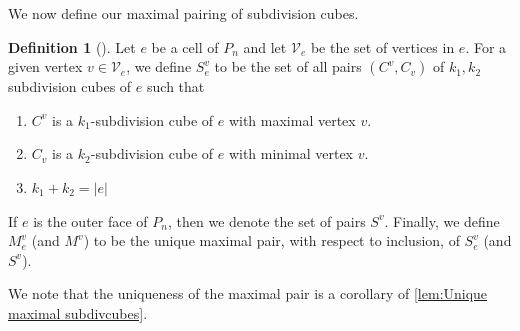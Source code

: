 \documentclass{amsart}
\newcommand{\darkblue}{\color{darkblue}} %
\theoremstyle{definition}
\newtheorem{definition}[theorem]{Definition}
\newcommand{\defn}[1]{\textsl{\darkblue #1}} %
\newcommand{\subdivpairsev}{S_e^v}
\newcommand{\maxsubdivpairsev}{M_e^v}
\newcommand{\subdivpairsv}{S^v}
\newcommand{\maxsubdivpairsv}{M^v}
\begin{document}
We now define our maximal pairing of subdivision cubes.

\begin{definition} [\cite{saneblidzeComparingDiagonalsAssociahedra2022}]\label{def:subdiv pairs}
Let $e$ be a cell of $P_n$ and let $\mathcal{V}_e$ be the set of vertices in $e$.
For a given vertex $v \in \mathcal{V}_e$, we define \defn{$\subdivpairsev$} to be the set of all pairs $(C^v,C_v)$ of $k_1,k_2$ subdivision cubes of $e$ such that
\begin{enumerate}
    \item $C^v$ is a $k_1$-subdivision cube of $e$ with maximal vertex $v$.
    \item $C_v$ is a $k_2$-subdivision cube of $e$ with minimal vertex $v$.
    \item $k_1+k_2 = |e|$
\end{enumerate}
If $e$ is the outer face of $P_n$, then we denote the set of pairs \defn{$\subdivpairsv$}.
Finally, we define \defn{$\maxsubdivpairsev$} (and \defn{$\maxsubdivpairsv$}) to be the unique maximal pair, with respect to inclusion, of $\subdivpairsev$ (and $\subdivpairsv$).
\end{definition}
We note that the uniqueness of the maximal pair is a corollary of \cref{lem:Unique maximal subdivcubes}.
\end{document}
